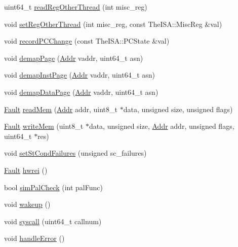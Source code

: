 \begin{DoxyCompactItemize}
uint64\_\-t \hyperlink{classCheckerCPU_a77cf978e7a92e33083fcc62cb7ead74d}{readRegOtherThread} (int misc\_\-reg)
\item 
void \hyperlink{classCheckerCPU_af05ac53fdafd8a612ca89f90b0c12910}{setRegOtherThread} (int misc\_\-reg, const TheISA::MiscReg \&val)
\item 
void \hyperlink{classCheckerCPU_a24cf06d21848d1a0b10efd6f1571d729}{recordPCChange} (const TheISA::PCState \&val)
\item 
void \hyperlink{classCheckerCPU_a2d698ff909513b48a1263f8a5440e067}{demapPage} (\hyperlink{base_2types_8hh_af1bb03d6a4ee096394a6749f0a169232}{Addr} vaddr, uint64\_\-t asn)
\item 
void \hyperlink{classCheckerCPU_ac8a36d45a839b07f50b73f1eee119615}{demapInstPage} (\hyperlink{base_2types_8hh_af1bb03d6a4ee096394a6749f0a169232}{Addr} vaddr, uint64\_\-t asn)
\item 
void \hyperlink{classCheckerCPU_a26789603cc94992d18f8ddedfff96acf}{demapDataPage} (\hyperlink{base_2types_8hh_af1bb03d6a4ee096394a6749f0a169232}{Addr} vaddr, uint64\_\-t asn)
\item 
\hyperlink{classRefCountingPtr}{Fault} \hyperlink{classCheckerCPU_a66191b2d8a45050b7df3c3efa7bb07c6}{readMem} (\hyperlink{base_2types_8hh_af1bb03d6a4ee096394a6749f0a169232}{Addr} addr, uint8\_\-t $\ast$data, unsigned size, unsigned flags)
\item 
\hyperlink{classRefCountingPtr}{Fault} \hyperlink{classCheckerCPU_ad46c5edeb1ee9b60445f3e26364e2c5e}{writeMem} (uint8\_\-t $\ast$data, unsigned size, \hyperlink{base_2types_8hh_af1bb03d6a4ee096394a6749f0a169232}{Addr} addr, unsigned flags, uint64\_\-t $\ast$res)
\item 
void \hyperlink{classCheckerCPU_abbe779fa43c72cd485ddb736ab17ff61}{setStCondFailures} (unsigned sc\_\-failures)
\item 
\hyperlink{classRefCountingPtr}{Fault} \hyperlink{classCheckerCPU_a5f42e07ae335dff417664e91518c7f1e}{hwrei} ()
\item 
bool \hyperlink{classCheckerCPU_a461205960be9d52e9beda48a77e9c600}{simPalCheck} (int palFunc)
\item 
void \hyperlink{classCheckerCPU_ae674290a26ecbd622c5160e38e8a4fe9}{wakeup} ()
\item 
void \hyperlink{classCheckerCPU_a3ef5bd684f938b4a925d4a9e7e1d4f94}{syscall} (uint64\_\-t callnum)
\item 
void \hyperlink{classCheckerCPU_a70b275e63748ddd6da7d2171c540ccff}{handleError} ()
\item 

\end{DoxyCompactItemize}
